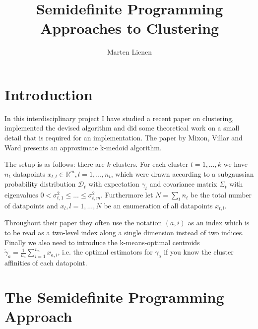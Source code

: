 \documentclass[10pt,a4paper]{article}
\title{Semidefinite Programming Approaches to Clustering}
\author{Marten Lienen}
\date{}
\begin{document}
\maketitle

\section{Introduction}

In this interdisciplinary project I have studied a recent paper on clustering, implemented the devised algorithm and did some theoretical work on a small detail that is required for an implementation.
The paper \cite{sdp} by Mixon, Villar and Ward presents an approximate k-medoid algorithm.

The setup is as follows: there are $k$ clusters.
For each cluster $t = 1, \dots, k$ we have $n_{t}$ datapoints $x_{t, l} \in \mathbb{R}^{m}, l = 1, \dots, n_{t}$, which were drawn according to a subgaussian probability distribution $\mathcal{D}_{t}$ with expectation $\gamma_{t}$ and covariance matrix $\Sigma_{t}$ with eigenvalues $0 < \sigma_{t, 1}^{2} \le \dots \le \sigma_{t, m}^{2}$.
Furthermore let $N = \sum_{t} n_{t}$ be the total number of datapoints and $x_{l}, l = 1, \dots, N$ be an enumeration of all datapoints $x_{t, l}$.

Throughout their paper they often use the notation $(a, i)$ as an index which is to be read as a two-level index along a single dimension instead of two indices.
Finally we also need to introduce the k-means-optimal centroids $\tilde{\gamma}_{a} = \frac{1}{n_{a}} \sum_{i = 1}^{n_{a}} x_{a, i}$, i.e. the optimal estimators for $\gamma_{a}$ if you know the cluster affinities of each datapoint.

\section{The Semidefinite Programming Approach}
\end{document}
